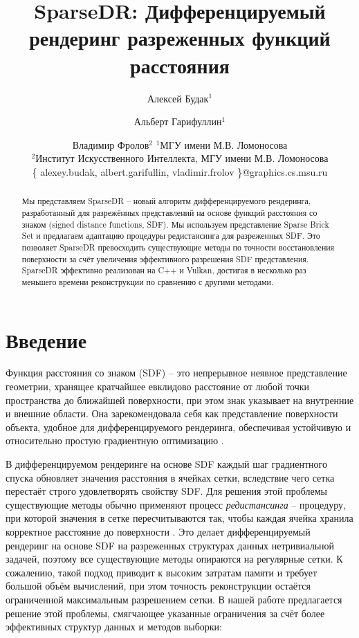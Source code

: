\documentclass{article}
\title{SparseDR: Дифференцируемый рендеринг разреженных функций расстояния}
\author{
Алексей Будак$^{1}$
\and
Альберт Гарифуллин$^1$\and
Владимир Фролов$^{2}$
\affiliations
$^1$МГУ имени М.В. Ломоносова\\
$^2$Институт Искусственного Интеллекта, МГУ имени М.В. Ломоносова\\
\emails %
\{ alexey.budak, albert.garifullin, vladimir.frolov \}@graphics.cs.msu.ru
}
\begin{document}
\maketitle

\begin{abstract}
	Мы представляем SparseDR -- новый алгоритм дифференцируемого рендеринга, разработанный для разрежённых представлений на основе функций расстояния со знаком (signed distance functions, SDF). Мы используем представление Sparse Brick Set и предлагаем адаптацию процедуры редистансинга для разреженных SDF. Это позволяет SparseDR превосходить существующие методы по точности восстановления поверхности за счёт увеличения эффективного разрешения SDF представления. SparseDR эффективно реализован на C++ и Vulkan, достигая в несколько раз меньшего времени реконструкции по сравнению с другими методами.
\end{abstract}

\section{Введение}

Функция расстояния со знаком (SDF) -- это непрерывное неявное представление геометрии, хранящее кратчайшее евклидово расстояние от любой точки пространства до ближайшей поверхности, при этом знак указывает на внутренние и внешние области. Она зарекомендовала себя как представление поверхности объекта, удобное для дифференцируемого рендеринга, обеспечивая устойчивую и относительно простую градиентную оптимизацию \cite{DRSDF24}.
  
  В дифференцируемом рендеринге на основе SDF каждый шаг градиентного спуска обновляет значения расстояния в ячейках сетки, вследствие чего сетка перестаёт строго удовлетворять свойству SDF. Для решения этой проблемы существующие методы обычно применяют процесс \textit{редистансинга} -- процедуру, при которой значения в сетке пересчитываются так, чтобы каждая ячейка хранила корректное расстояние до поверхности \cite{DETRIXHE201346}. Это делает дифференцируемый рендеринг на основе SDF на разреженных структурах данных нетривиальной задачей, поэтому все существующие методы опираются на регулярные сетки. К сожалению, такой подход приводит к высоким затратам памяти и требует большой объём вычислений, при этом точность реконструкции остаётся ограниченной максимальным разрешением сетки. В нашей работе предлагается решение этой проблемы, смягчающее указанные ограничения за счёт более эффективных структур данных и методов выборки:
  
\end{document}
